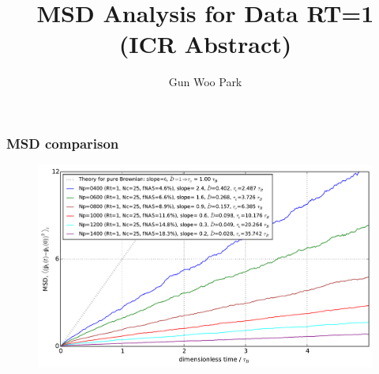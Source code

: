 \documentclass[slidestop, compress, mathserif]{beamer}
\title{MSD Analysis for Data RT=1 (ICR Abstract)}
\author{Gun Woo Park}
\begin{document}
\begin{frame}
  \maketitle
\end{frame}

\begin{frame}
  \frametitle{MSD comparison}
  \begin{figure}
    \centering
    \includegraphics[width=\textwidth]{../diffusion_map.pdf}
  \end{figure}
\end{frame}
\end{document}
